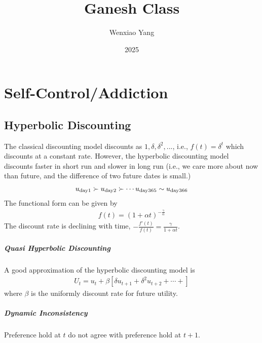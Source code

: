 \documentclass[11pt]{elegantbook}
\title{Ganesh Class}
\author{Wenxiao Yang}
\institute{Haas School of Business, University of California Berkeley}
\date{2025}
\begin{document}
\maketitle

\frontmatter
\tableofcontents

\mainmatter



\chapter{Self-Control/Addiction}
\section{Hyperbolic Discounting}
The classical discounting model discounts as $1,\delta,\delta^2,...$, i.e., $f(t)=\delta^t$ which discounts at a constant rate. However, the hyperbolic discounting model discounts faster in short run and slower in long run (i.e., we care more about now than future, and the difference of two future dates is small.)
\begin{equation}
    \begin{aligned}
        u_\textnormal{day1}\succ u_\textnormal{day2}\succ \cdots u_\textnormal{day365}\sim u_\textnormal{day366}
    \end{aligned}
    \nonumber
\end{equation}
The functional form can be given by
\begin{equation}
    \begin{aligned}
        f(t)=\left(1+\alpha t\right)^{-\frac{\gamma}{\alpha}}
    \end{aligned}
    \nonumber
\end{equation}
The discount rate is declining with time, $-\frac{f'(t)}{f(t)}=\frac{\gamma}{1+\alpha t}$.

\paragraph*{Quasi Hyperbolic Discounting}
A good approximation of the hyperbolic discounting model is
\begin{equation}
    \begin{aligned}
        U_t=u_t+\beta\left[\delta u_{t+1}+\delta^2 u_{t+2}+\cdots+\right]
    \end{aligned}
    \nonumber
\end{equation}
where $\beta$ is the uniformly discount rate for future utility.

\paragraph*{Dynamic Inconsistency} Preference hold at $t$ do not agree with preference hold at $t+1$.
\end{document}
